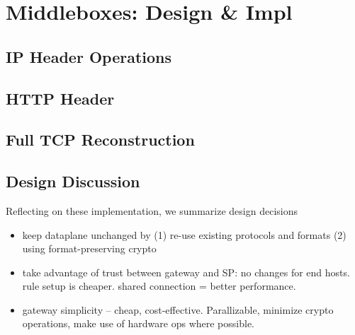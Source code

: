 
\section{Middleboxes: Design \& Impl}
\label{sec:mbs}

\subsection{IP Header Operations}

\subsection{HTTP Header}

\subsection{Full TCP Reconstruction}


\subsection{Design Discussion}
Reflecting on these implementation, we summarize design decisions
\begin{itemize}
  \item keep dataplane unchanged by (1) re-use existing protocols and formats (2) using format-preserving crypto
  \item take advantage of trust between gateway and SP: no changes for end hosts. rule setup is cheaper. shared connection = better performance.
  \item gateway simplicity -- cheap, cost-effective. Parallizable, minimize crypto operations, make use of hardware ops where possible. 
\end{itemize}

